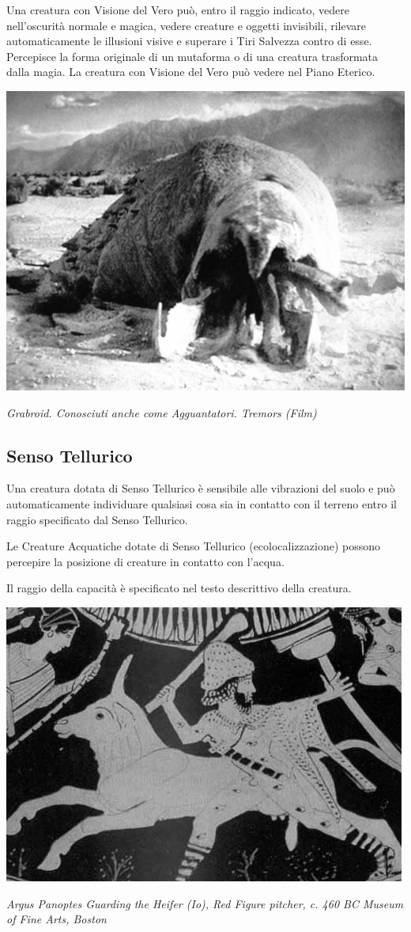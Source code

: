 \begin{multicols}{2}
Una creatura con Visione del Vero può, entro il raggio indicato, vedere nell'oscurità normale e magica, vedere creature e oggetti invisibili, rilevare automaticamente le illusioni visive e superare i Tiri Salvezza contro di esse. Percepisce la forma originale di un mutaforma o di una creatura trasformata dalla magia. La creatura con Visione del Vero può vedere nel Piano Eterico.

\medskip

\begin{center}
\includegraphics[height=0.65\linewidth]{immagini/grabroid.png}

\medskip

\emph{Grabroid. Conosciuti anche come Agguantatori. Tremors (Film)}
\end{center}

\subsection{Senso Tellurico}\label{sensotellurico}
Una creatura dotata di Senso Tellurico è sensibile alle vibrazioni del suolo e può automaticamente individuare qualsiasi cosa sia in contatto con il terreno entro il raggio specificato dal Senso Tellurico.

Le Creature Acquatiche dotate di Senso Tellurico (ecolocalizzazione) possono percepire la posizione di creature in contatto con l'acqua.

Il raggio della capacità è specificato nel testo descrittivo della creatura.

\end{multicols}

\vfill

\begin{center}
	\includegraphics[width=0.75\linewidth]{immagini/argus2.png}

	\emph{Argus Panoptes Guarding the Heifer (Io), Red Figure pitcher, c. 460 BC Museum of Fine Arts, Boston}
\end{center}

\pagebreak
